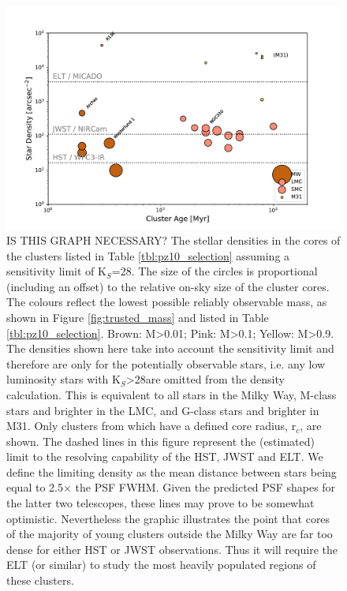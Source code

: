 \begin{figure}

    \centering
    \includegraphics[width=\textwidth]{images/star_density_vs_age.pdf}

    \caption{\rewrite IS THIS GRAPH NECESSARY? 
    The stellar densities in the cores of the clusters listed in Table \ref{tbl:pz10_selection} assuming a sensitivity limit of K$_S$=28\m. 
    The size of the circles is proportional (including an offset) to the relative on-sky size of the cluster cores. 
    The colours reflect the lowest possible reliably observable mass, as shown in Figure \ref{fig:trusted_mass} and listed in Table \ref{tbl:pz10_selection}. 
    Brown: M\textgreater0.01\msun; Pink: M\textgreater0.1\msun; Yellow: M\textgreater0.9\msun. 
    The densities shown here take into account the sensitivity limit and therefore are only for the potentially observable stars, i.e. any low luminosity stars with K$_S$\textgreater28\m are omitted from the density calculation. 
    This is equivalent to all stars in the Milky Way, M-class stars and brighter in     the LMC, and G-class stars and brighter in M31. 
    Only clusters from \citet{portegies2010} which have a defined core radius, r$_c$, are shown.
    The dashed lines in this figure represent the (estimated) limit to the resolving capability of the HST, JWST and ELT. 
    We define the limiting density as the mean distance between stars being equal to 2.5$\times$ the PSF FWHM.
    Given the predicted PSF shapes for the latter two telescopes, these lines may prove to be somewhat optimistic. 
    Nevertheless the graphic illustrates the point that cores of the majority of young clusters outside the Milky Way are far too dense for either HST or JWST observations.
    Thus it will require the ELT (or similar) to study the most heavily populated regions of these clusters.}
    
    \label{fig:star_density_vs_age}
    
\end{figure}


